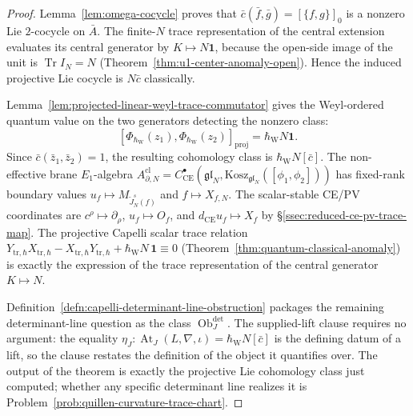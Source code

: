 \documentclass[11pt]{memoir}
\begin{document}
\begin{proof}
  Lemma~\ref{lem:omega-cocycle} proves that
  \(\bar c(\bar f,\bar g)=[\{f,g\}]_0\) is a nonzero Lie \(2\)-cocycle on
  \(\bar A\).  The finite-\(N\) trace representation of the central
  extension evaluates its central generator by \(K\mapsto N\mathbf 1\),
  because the open-side image of the unit is
  \(\operatorname{Tr}I_N=N\) (Theorem~\ref{thm:u1-center-anomaly-open}).
  Hence the induced projective Lie cocycle is \(N\bar c\) classically.

  Lemma~\ref{lem:projected-linear-weyl-trace-commutator} gives the
  Weyl-ordered quantum value on the two generators detecting the
  nonzero class:
  \[
    [\Phi_{\hbar_{\mathrm{W}}}(z_1),
     \Phi_{\hbar_{\mathrm{W}}}(z_2)]_{\mathrm{proj}}
      =\hbar_{\mathrm{W}}N\mathbf 1 .
  \]
  Since \(\bar c(\bar z_1,\bar z_2)=1\), the resulting cohomology class is
  \(\hbar_{\mathrm{W}}N[\bar c]\).  The non-effective brane \(E_1\)-algebra
  \(A^{\mathrm{cl}}_{\partial,N}=
    C^\bullet_{\mathrm{CE}}(\mathfrak{gl}_N,
                            \mathrm{Kosz}_{\mathfrak{gl}_N}([\phi_1,\phi_2]))\)
  has fixed-rank boundary values
  \(u_f\mapsto M_{\widetilde J_N^s(f)}\) and
  \(f\mapsto X_{f,N}\).  The scalar-stable CE/PV coordinates are
  \(c^\rho\mapsto\partial_\rho\), \(u_f\mapsto O_f\), and
  \(d_{\mathrm{CE}}u_f\mapsto X_f\) by
  \S\ref{ssec:reduced-ce-pv-trace-map}.  The projective Capelli scalar trace relation
  \(Y_{\mathrm{tr},\hbar}X_{\mathrm{tr},\hbar}
  -X_{\mathrm{tr},\hbar}Y_{\mathrm{tr},\hbar}
  +\hbar_{\mathrm{W}}N\,\mathbf 1\equiv 0\)
  (Theorem~\ref{thm:quantum-classical-anomaly}) is exactly the
  expression of the trace representation of the central generator
  \(K\mapsto N\).

  Definition~\ref{defn:capelli-determinant-line-obstruction} packages the
  remaining determinant-line question as the class
  \(\operatorname{Ob}^{\det}_J\).  The supplied-lift clause requires no
  argument: the equality
  \(\eta_J\colon\operatorname{At}_J(L,\nabla,\iota)
  =\hbar_{\mathrm{W}}N[\bar c]\) is the defining datum of a lift, so
  the clause restates the definition of the object it quantifies over.
  The output of the theorem is exactly the
  projective Lie cohomology class just computed; whether any specific
  determinant line realizes it is
  Problem~\ref{prob:quillen-curvature-trace-chart}.
\end{proof}
\end{document}
